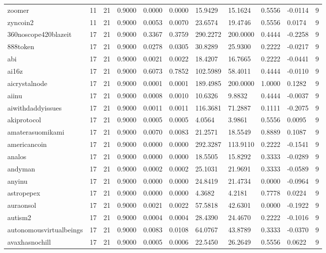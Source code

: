 \begin{table}[htbp]
\begin{tabular}{lllllllllll}
zoomer & 11 & 21 & 0.9000 & 0.0000 & 0.0000 & 15.9429 & 15.1624 & 0.5556 & -0.0114 & 9 \\
zyncoin2 & 11 & 21 & 0.9000 & 0.0053 & 0.0070 & 23.6574 & 19.4746 & 0.5556 & 0.0174 & 9 \\
360noscope420blazeit & 17 & 21 & 0.9000 & 0.3367 & 0.3759 & 290.2272 & 200.0000 & 0.4444 & -0.2258 & 9 \\
888token & 17 & 21 & 0.9000 & 0.0278 & 0.0305 & 30.8289 & 25.9300 & 0.2222 & -0.0217 & 9 \\
abi & 17 & 21 & 0.9000 & 0.0021 & 0.0022 & 18.4207 & 16.7665 & 0.2222 & -0.0441 & 9 \\
ai16z & 17 & 21 & 0.9000 & 0.6073 & 0.7852 & 102.5989 & 58.4011 & 0.4444 & -0.0110 & 9 \\
aicrystalnode & 17 & 21 & 0.9000 & 0.0001 & 0.0001 & 189.4985 & 200.0000 & 1.0000 & 0.1282 & 9 \\
aiinu & 17 & 21 & 0.9000 & 0.0008 & 0.0010 & 10.6326 & 9.8832 & 0.4444 & -0.0037 & 9 \\
aiwithdaddyissues & 17 & 21 & 0.9000 & 0.0011 & 0.0011 & 116.3681 & 71.2887 & 0.1111 & -0.2075 & 9 \\
akiprotocol & 17 & 21 & 0.9000 & 0.0005 & 0.0005 & 4.0564 & 3.9861 & 0.5556 & 0.0095 & 9 \\
amaterasuomikami & 17 & 21 & 0.9000 & 0.0070 & 0.0083 & 21.2571 & 18.5549 & 0.8889 & 0.1087 & 9 \\
americancoin & 17 & 21 & 0.9000 & 0.0000 & 0.0000 & 292.3287 & 113.9110 & 0.2222 & -0.1541 & 9 \\
analos & 17 & 21 & 0.9000 & 0.0000 & 0.0000 & 18.5505 & 15.8292 & 0.3333 & -0.0289 & 9 \\
andyman & 17 & 21 & 0.9000 & 0.0002 & 0.0002 & 25.1031 & 21.9691 & 0.3333 & -0.0589 & 9 \\
anyinu & 17 & 21 & 0.9000 & 0.0000 & 0.0000 & 24.8419 & 21.4734 & 0.0000 & -0.0964 & 9 \\
astropepex & 17 & 21 & 0.9000 & 0.0000 & 0.0000 & 4.3682 & 4.2181 & 0.7778 & 0.0224 & 9 \\
auraonsol & 17 & 21 & 0.9000 & 0.0021 & 0.0022 & 57.5818 & 42.6301 & 0.0000 & -0.1922 & 9 \\
autism2 & 17 & 21 & 0.9000 & 0.0004 & 0.0004 & 28.4390 & 24.4670 & 0.2222 & -0.1016 & 9 \\
autonomousvirtualbeings & 17 & 21 & 0.9000 & 0.0083 & 0.0108 & 64.0767 & 43.8789 & 0.3333 & -0.0370 & 9 \\
avaxhasnochill & 17 & 21 & 0.9000 & 0.0005 & 0.0006 & 22.5450 & 26.2649 & 0.5556 & 0.0622 & 9 \\

\end{tabular}
\end{table}
